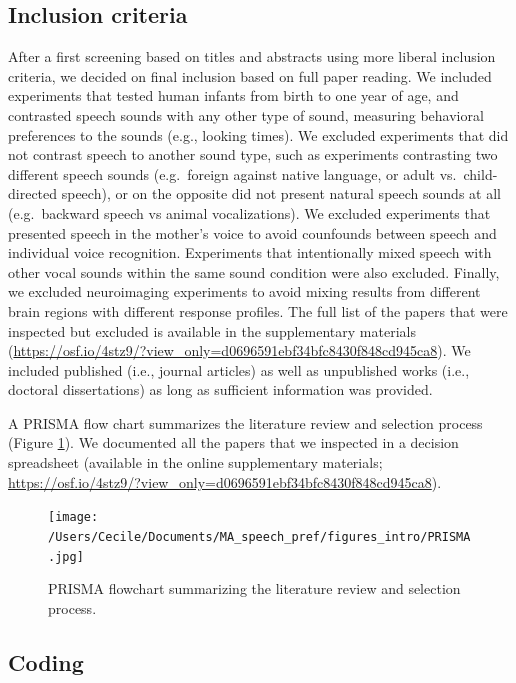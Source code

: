 \documentclass[man]{apa6}
\begin{document}
\subsection{Inclusion criteria}\label{inclusion-criteria}

After a first screening based on titles and abstracts using more liberal
inclusion criteria, we decided on final inclusion based on full paper
reading. We included experiments that tested human infants from birth to
one year of age, and contrasted speech sounds with any other type of
sound, measuring behavioral preferences to the sounds (e.g., looking
times). We excluded experiments that did not contrast speech to another
sound type, such as experiments contrasting two different speech sounds
(e.g.~foreign against native language, or adult vs.~child-directed
speech), or on the opposite did not present natural speech sounds at all
(e.g.~backward speech vs animal vocalizations). We excluded experiments
that presented speech in the mother's voice to avoid counfounds between
speech and individual voice recognition. Experiments that intentionally
mixed speech with other vocal sounds within the same sound condition
were also excluded. Finally, we excluded neuroimaging experiments to
avoid mixing results from different brain regions with different
response profiles. The full list of the papers that were inspected but
excluded is available in the supplementary materials
(\url{https://osf.io/4stz9/?view_only=d0696591ebf34bfc8430f848cd945ca8}).
We included published (i.e., journal articles) as well as unpublished
works (i.e., doctoral dissertations) as long as sufficient information
was provided.

A PRISMA flow chart summarizes the literature review and selection
process (Figure \ref{fig:prisma}). We documented all the papers that we
inspected in a decision spreadsheet (available in the online
supplementary materials;
\url{https://osf.io/4stz9/?view_only=d0696591ebf34bfc8430f848cd945ca8}).

\begin{figure}
\centering
\texttt{[image: /Users/Cecile/Documents/MA\_speech\_pref/figures\_intro/PRISMA.jpg]}
\caption{\label{fig:prisma}PRISMA flowchart summarizing the literature
review and selection process.}
\end{figure}

\subsection{Coding}\label{coding}
\end{document}
